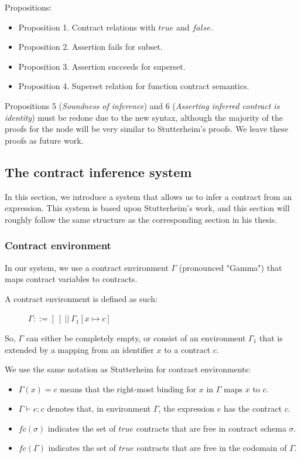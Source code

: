 \documentclass[10pt]{report}
\newcommand{\code}[1]{%
  {%
   \setlength{\fboxsep}{-2\fboxrule}%
   \fcolorbox{black}{light-gray}{\hspace{1.5pt}\strut\texttt{#1}\hspace{1.5pt}}%
  }%
}
\begin{document}
Propositions:
\begin{itemize}
	\item Proposition 1. Contract relations with $true$ and $false$.
	\item Proposition 2. Assertion fails for subset.
	\item Proposition 3. Assertion succeeds for superset.
	\item Proposition 4. Superset relation for function contract semantics.
\end{itemize}

Propositions 5 (\textit{Soundness of inference}) and 6 (\textit{Asserting inferred contract is identity}) must be redone due to the new syntax, although the majority of the proofs for the \code{Expr} node will be very similar to Stutterheim's proofs.
We leave these proofs as future work.

\subsection{The contract inference system}
\label{section:contract-inference-system}
In this section, we introduce a system that allows us to infer a contract from an expression.
This system is based upon Stutterheim's work, and this section will roughly follow the same structure as the corresponding section in his thesis.

\subsubsection{Contract environment}

In our system, we use a contract environment $\Gamma$ (pronounced "Gamma") that maps contract variables to contracts.

A contract environment is defined as such:

\begin{figure}[htbp]
$\Gamma ::= [\!~]\!~||\!~\Gamma_1[x \mapsto c]$
\end{figure}

So, $\Gamma$ can either be completely empty, or consist of an environment $\Gamma_1$ that is extended by a mapping from an identifier $x$ to a contract $c$.

We use the same notation as Stutterheim for contract environments:
\begin{itemize}
	\item $\Gamma(x)=c$ means that the right-most binding for $x$ in $\Gamma$ maps $x$ to $c$.
	\item $\Gamma \vdash e : c$ denotes that, in environment $\Gamma$, the expression $e$ has the contract $c$.
	\item $fc(\sigma)$ indicates the set of $true$ contracts that are free in contract schema $\sigma$.
	\item $fc(\Gamma)$ indicates the set of $true$ contracts that are free in the codomain of $\Gamma$.
\end{itemize}
\end{document}
